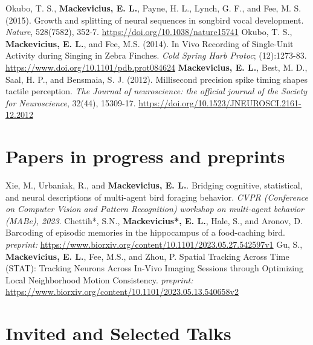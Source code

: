 \documentclass[11pt,a4paper]{moderncv}
\begin{document}
\newline
Okubo, T. S., \textbf{Mackevicius, E. L.}, Payne, H. L., Lynch, G. F.,  and  Fee, M. S. (2015). Growth and splitting of neural sequences in songbird vocal development. \textit{Nature}, 528(7582), 352-7. \url{https://doi.org/10.1038/nature15741}
\newline
\newline
 Okubo, T. S., \textbf{Mackevicius, E. L.},  and   Fee, M.S. (2014). In Vivo Recording of Single-Unit Activity during Singing in Zebra Finches. \textit{Cold Spring Harb Protoc}; (12):1273-83. \url{https://www.doi.org/10.1101/pdb.prot084624}
\newline
\newline
\textbf{Mackevicius, E. L.}, Best, M. D., Saal, H. P.,  and  Bensmaia, S. J. (2012). Millisecond precision spike timing shapes tactile perception. \textit{The Journal of neuroscience: the official journal of the Society for Neuroscience}, 32(44), 15309-17. \url{https://doi.org/10.1523/JNEUROSCI.2161-12.2012}

\section{Papers in progress and preprints}
Xie, M., Urbaniak, R., and \textbf{Mackevicius, E. L.}. Bridging cognitive, statistical, and neural descriptions of multi-agent bird foraging behavior.  \emph{CVPR (Conference on Computer Vision and Pattern Recognition) workshop on multi-agent behavior (MABe), 2023}.
\newline
\newline
Chettih*, S.N., \textbf{Mackevicius*, E. L.}, Hale, S., and Aronov, D. Barcoding of episodic memories in the hippocampus of a food-caching bird. \emph{preprint:}
\url{https://www.biorxiv.org/content/10.1101/2023.05.27.542597v1}
\newline
\newline
Gu, S., \textbf{Mackevicius, E. L.}, Fee, M.S., and Zhou, P. Spatial Tracking Across Time (STAT): Tracking Neurons Across In-Vivo Imaging Sessions through Optimizing Local Neighborhood Motion Consistency. \emph{preprint:}
\url{https://www.biorxiv.org/content/10.1101/2023.05.13.540658v2}


\section{Invited and Selected Talks}
\end{document}
